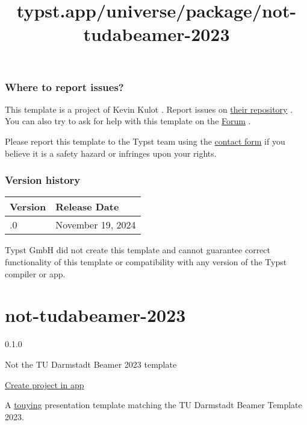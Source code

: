 \subsubsection{Where to report issues?}\label{where-to-report-issues}

This template is a project of Kevin Kulot . Report issues on
\href{https://github.com/xkevio/parcio-typst/}{their repository} . You
can also try to ask for help with this template on the
\href{https://forum.typst.app}{Forum} .

Please report this template to the Typst team using the
\href{https://typst.app/contact}{contact form} if you believe it is a
safety hazard or infringes upon your rights.

\label{versions}
\subsubsection{Version history}\label{version-history}

\begin{longtable}[]{@{}ll@{}}
\toprule\noalign{}
Version & Release Date \\
\midrule\noalign{}
\endhead
\bottomrule\noalign{}
\endlastfoot
0.1.0 & November 19, 2024 \\
\end{longtable}

Typst GmbH did not create this template and cannot guarantee correct
functionality of this template or compatibility with any version of the
Typst compiler or app.


\title{typst.app/universe/package/not-tudabeamer-2023}

\label{banner}
\label{template-thumbnail}

\section{not-tudabeamer-2023}\label{not-tudabeamer-2023}

{ 0.1.0 }

Not the TU Darmstadt Beamer 2023 template

\href{/app?template=not-tudabeamer-2023&version=0.1.0}{Create project in
app}

\label{readme}
A \href{https://github.com/touying-typ/touying}{touying} presentation
template matching the TU Darmstadt Beamer Template 2023.

